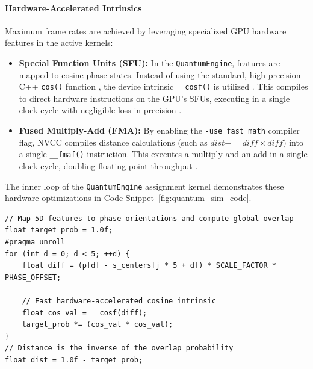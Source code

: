 \paragraph{Hardware-Accelerated Intrinsics}\label{subsect:intrinsics}
Maximum frame rates are achieved by leveraging specialized GPU hardware features in the active kernels:
\begin{itemize}
    \item \textbf{Special Function Units (SFU):} In the \texttt{QuantumEngine}, features are mapped to cosine phase states. Instead of using the standard, high-precision C++ \texttt{cos()} function \cite{cppreference_cos}, the device intrinsic \texttt{\_\_cosf()} is utilized \cite{CudaGuide}. This compiles to direct hardware instructions on the GPU's SFUs, executing in a single clock cycle with negligible loss in precision \cite{CudaGuide}.
    \item \textbf{Fused Multiply-Add (FMA):} By enabling the \texttt{-use\_fast\_math} compiler flag, NVCC compiles distance calculations (such as $dist += diff \times diff$) into a single \texttt{\_\_fmaf()} instruction. This executes a multiply and an add in a single clock cycle, doubling floating-point throughput \cite{CudaGuide}.
\end{itemize}

The inner loop of the \texttt{QuantumEngine} assignment kernel demonstrates these hardware optimizations in Code Snippet~\ref{fig:quantum_sim_code}.

\begin{lstlisting}[float=htbp, caption={Quantum-inspired phase mapping and fast SFU cosine evaluation in \texttt{quantum\_engine.cu} (lines 68-81).}, label={fig:quantum_sim_code}]
// Map 5D features to phase orientations and compute global overlap
float target_prob = 1.0f;
#pragma unroll
for (int d = 0; d < 5; ++d) {
    float diff = (p[d] - s_centers[j * 5 + d]) * SCALE_FACTOR * PHASE_OFFSET;
    
    // Fast hardware-accelerated cosine intrinsic
    float cos_val = __cosf(diff);
    target_prob *= (cos_val * cos_val);
}
// Distance is the inverse of the overlap probability
float dist = 1.0f - target_prob;
\end{lstlisting}

